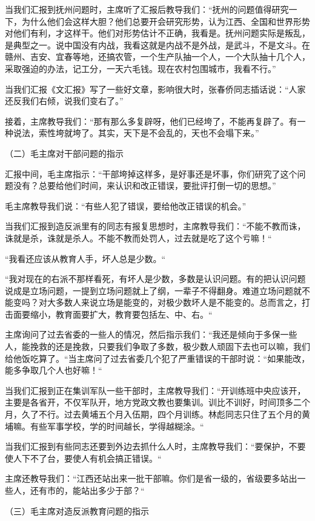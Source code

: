 当我们汇报到抚州问题时，主席听了汇报后教导我们：“抚州的问题值得研究一下，为什么他们会这样大胆？他们总要开会研究形势，认为江西、全国和世界形势对他们有利，才这样干。他们对形势估计不正确，我看是。抚州问题实际是叛乱，是典型之一。说中国没有内战，我看这就是内战不是外战，是武斗，不是文斗。在赣州、吉安、宜春等地，还搞农管，一个生产队抽一个人，一个大队抽十几个人，采取强迫的办法，记工分，一天六毛钱。现在农村包围城市，我看不行。”

当我们汇报《文汇报》写了一些好文章，影响很大时，张春侨同志插话说：“人家还反我们右倾，说我们变右了。”

接着，主席教导我们：“那有那么多复辟呀，他们已经垮了，不能再复辟了。有一种说法，索性垮就垮了。其实，天下是不会乱的，天也不会塌下来。”

（二）毛主席对干部问题的指示

汇报中间，毛主席指示：“干部垮掉这样多，是好事还是坏事，你们研究了这个问题没有？总要给他们时间，来认识和改正错误，要批评打倒一切的思想。”

毛主席教导我们说：“有些人犯了错误，要给他改正错误的机会。”

当我们汇报到造反派里有的同志有报复思想时，主席教导我们：“不能不教而诛，诛就是杀，诛就是杀人。不能不教而处罚人，过去就是吃了这个亏嘛！“

“我看还应该从教育人手，坏人总是少数。“

“我对现在的右派不那样看死，有坏人是少数，多数是认识问题。有的把认识问题说成是立场问题，一提到立场问题就上了纲，一辈子不得翻身。难道立场问题就不能变吗？对大多数人来说立场是能变的，对极少数坏人是不能变的。总而言之，打击面要缩小，教育面要扩大，教育要包括左、中、右。“

主席询问了过去省委的一些人的情况，然后指示我们：“我还是倾向于多保一些人，能挽救的还是挽救，只要我们争取了多数，极少数人顽固下去也可以嘛，我们给他饭吃算了。“当主席问了过去省委几个犯了严重错误的干部时说：“如果能改，能多争取几个人也好嘛！“

当我们汇报到正在集训军队一些干部时，主席教导我们：“开训练班中央应该开，主要是各省开，不仅军队开，地方党政文教也要集训。训比不训好，时间顶多二个月，久了不行。过去黄埔五个月入伍期，四个月训练。林彪同志只住了五个月的黄埔嘛。有些军事学校，学的时间越长，学得越糊涂。“

当我们汇报到有些同志还要到外边去抓什么人时，主席教导我们：“要保护，不要使人下不了台，要使人有机会搞正错误。“

主席还教导我们：“江西还站出来一批干部嘛。你们是省一级的，省级要多站出一些人，还有市的，能站出多少于部？“

（三）毛主席对造反派教育问题的指示

